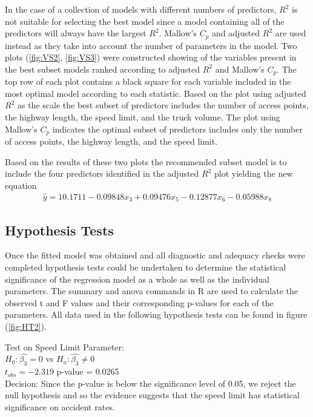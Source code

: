 \documentclass[12pt]{report}
\begin{document}
In the case of a collection of models with different numbers of predictors, $R^2$ is not suitable for selecting the best model since a model containing all of the predictors will always have the largest $R^2$. Mallow's $C_{p}$ and adjusted $R^2$ are used instead as they take into account the number of parameters in the model. Two plots (\ref{fig:VS2}, \ref{fig:VS3}) were constructed showing of the variables present in the best subset models ranked according to adjusted $R^2$ and Mallow's $C_{p}$. The top row of each plot contains a black square for each variable included in the most optimal model according to each statistic. Based on the plot using adjusted $R^2$ as the scale the best subset of predictors includes the number of access points, the highway length, the speed limit, and the truck volume. The plot using Mallow's $C_{p}$ indicates the optimal subset of predictors includes only the number of access points, the highway length, and the speed limit. 

Based on the results of these two plots the recommended subset model is to include the four predictors identified in the adjusted $R^2$ plot yielding the new equation 
\begin{equation} \label{bestEq}
    \begin{aligned}
    \hat{y} = 10.1711 - 0.09848x_{3} + 0.09476x_{5} - 0.12877x_{6} - 0.05988x_{8}
    \end{aligned}
\end{equation}

\subsection{Hypothesis Tests}

Once the fitted model was obtained and all diagnostic and adequacy checks were completed hypothesis tests could be undertaken to determine the statistical significance of the regression model as a whole as well as the individual parameters. The summary and anova commands in R are used to calculate the observed t and F values and their corresponding p-values for each of the parameters. All data used in the following hypothesis tests can be found in figure (\ref{fig:HT2}).    

Test on Speed Limit Parameter:
\\$H_{0}: \hat{\beta_{3}} = 0$ vs $H_{a}: \hat{\beta_{3}} \neq 0$
\\$t_{obs} = -2.319$ \quad p-value = 0.0265
\\Decision: Since the p-value is below the significance level of 0.05, we reject the null hypothesis and so the evidence suggests that the speed limit has statistical significance on accident rates.
\end{document}
